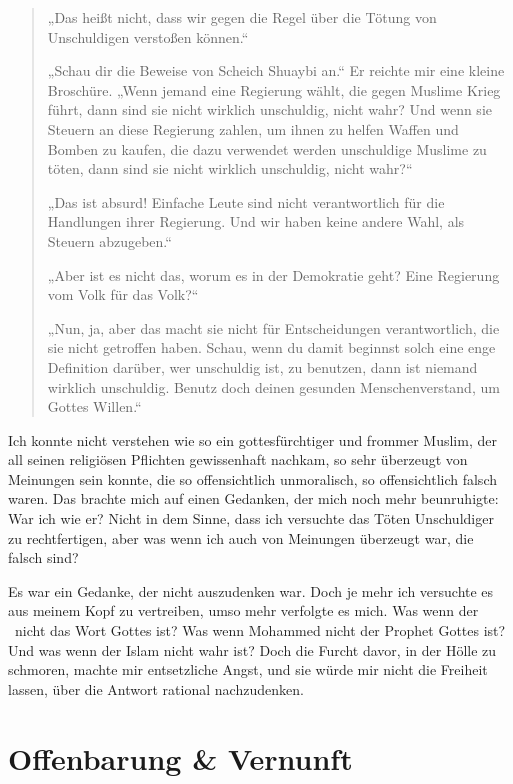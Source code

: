 \documentclass[12pt]{memoir}
\begin{document}
\begin{quote}
„Das heißt nicht, dass wir gegen die Regel
über die Tötung von Unschuldigen verstoßen können.“

„Schau dir die Beweise von Scheich Shuaybi an.“
Er reichte mir eine kleine Broschüre.
„Wenn jemand eine Regierung wählt, die gegen Muslime Krieg führt,
dann sind sie nicht wirklich unschuldig, nicht wahr?
Und wenn sie Steuern an diese Regierung zahlen,
um ihnen zu helfen Waffen und Bomben zu kaufen,
die dazu verwendet werden unschuldige Muslime zu töten,
dann sind sie nicht wirklich unschuldig, nicht wahr?“

„Das ist absurd! Einfache Leute sind nicht verantwortlich
für die Handlungen ihrer Regierung.
Und wir haben keine andere Wahl, als Steuern abzugeben.“

„Aber ist es nicht das, worum es in der Demokratie geht?
Eine Regierung vom Volk für das Volk?“

„Nun, ja, aber das macht sie nicht für Entscheidungen verantwortlich,
die sie nicht getroffen haben.
Schau, wenn du damit beginnst solch eine enge Definition darüber,
wer unschuldig ist, zu benutzen, dann ist niemand wirklich unschuldig.
Benutz doch deinen gesunden Menschenverstand, um Gottes Willen.“
\end{quote}

Ich konnte nicht verstehen wie so ein gottesfürchtiger und frommer Muslim,
der all seinen religiösen Pflichten gewissenhaft nachkam,
so sehr überzeugt von Meinungen sein konnte,
die so offensichtlich unmoralisch, so offensichtlich falsch waren.
Das brachte mich auf einen Gedanken, der mich noch mehr beunruhigte:
War ich wie er?
Nicht in dem Sinne,
dass ich versuchte das Töten Unschuldiger zu rechtfertigen,
aber was wenn ich auch von Meinungen überzeugt war, die falsch sind?

Es war ein Gedanke, der nicht auszudenken war.
Doch je mehr ich versuchte es aus meinem Kopf zu vertreiben,
umso mehr verfolgte es mich.
Was wenn der \Quran\ nicht das Wort Gottes ist?
Was wenn Mohammed nicht der Prophet Gottes ist?
Und was wenn der Islam nicht wahr ist?
Doch die Furcht davor, in der Hölle zu schmoren,
machte mir entsetzliche Angst,
und sie würde mir nicht die Freiheit lassen,
über die Antwort rational nachzudenken.


\chapter{Offenbarung \& Vernunft}
\end{document}
